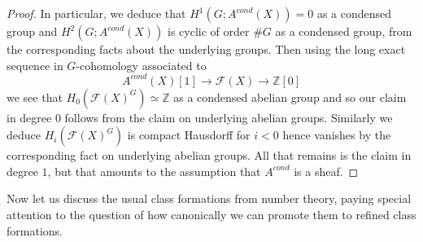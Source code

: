\documentclass[12pt]{article}
\theoremstyle{definition}
\newcommand{\mc}{\mathcal}
\newcommand{\mbb}{\mathbb}
\begin{document}
\begin{proof}
In particular, we deduce that $H^1(G;A^{cond}(X))=0$ as a condensed group and $H^2(G;A^{cond}(X))$ is cyclic of order $\#G$ as a condensed group, from the corresponding facts about the underlying groups.  Then using the long exact sequence in $G$-cohomology associated to
$$A^{cond}(X)[1] \to \mc{F}(X) \to \mbb{Z}[0]$$
we see that $H_0(\mc{F}(X)^G)\simeq \mbb{Z}$ as a condensed abelian group and so our claim in degree $0$ follows from the claim on underlying abelian groups.  Similarly we deduce $H_i(\mc{F}(X)^G)$ is compact Hausdorff for $i<0$ hence vanishes by the corresponding fact on underlying abelian groups.  All that remains is the claim in degree $1$, but that amounts to the assumption that $A^{cond}$ is a sheaf.
\end{proof}

Now let us discuss the usual class formations from number theory, paying special attention to the question of how canonically we can promote them to refined class formations.
\end{document}
